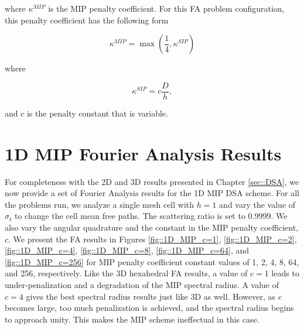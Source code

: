 \noindent where $\kappa^{MIP}$ is the MIP penalty coefficient. For this FA problem configuration, this penalty coefficient has the following form

\begin{equation}
\label{eq::App_DSA_MIP_penalty}
\kappa^{MIP} = \max (\frac{1}{4} , \kappa^{SIP})
\end{equation}

\noindent where

\begin{equation}
\label{eq::App_DSA_IP_penalty}
\kappa^{SIP} = c \frac{D}{h},
\end{equation}

\noindent and $c$ is the penalty constant that is variable.

\section{1D MIP Fourier Analysis Results}
\label{sec::App_DSA_resutls}

For completeness with the 2D and 3D results presented in Chapter \ref{sec::DSA}, we now provide a set of Fourier Analysis results for the 1D MIP DSA scheme. For all the problems run, we analyze a single mesh cell with $h=1$ and vary the value of $\sigma_t$ to change the cell mean free paths. The scattering ratio is set to 0.9999. We also vary the angular quadrature and the constant in the MIP penalty coefficient, $c$. We present the FA results in Figures \ref{fig::1D_MIP_c=1}, \ref{fig::1D_MIP_c=2}, \ref{fig::1D_MIP_c=4}, \ref{fig::1D_MIP_c=8}, \ref{fig::1D_MIP_c=64}, and \ref{fig::1D_MIP_c=256} for MIP penalty coefficient constant values of 1, 2, 4, 8, 64, and 256, respectively. Like the 3D hexahedral FA results, a value of $c=1$ leads to under-penalization and a degradation of the MIP spectral radius. A value of $c=4$ gives the best spectral radius results just like 3D as well. However, as $c$ becomes large, too much penalization is achieved, and the spectral radius begins to approach unity. This makes the MIP scheme ineffectual in this case.


